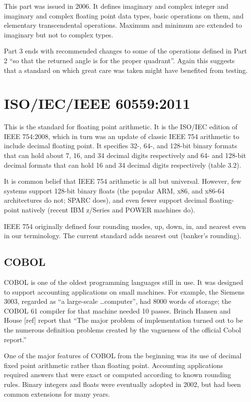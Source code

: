 \documentclass{article}
\begin{document}
This part was issued in 2006.  It defines imaginary and
complex integer and imaginary and complex floating point
data types, basic operations on them, and elementary
transcendental operations.  Maximum and minimum are extended
to imaginary but not to complex types.

Part 3 ends with recommended changes to some of the operations
defined in Part 2 ``so that the returned angle is for the
proper quadrant''.  Again this suggests that a standard on which
great care was taken might have benefited from testing.

\section{ISO/IEC/IEEE 60559:2011}

This is the standard for floating point arithmetic.
It is the ISO/IEC edition of IEEE 754:2008, which in
turn was an update of classic IEEE 754 arithmetic to
include decimal floating point.  It specifies
32-, 64-, and 128-bit binary formats that can hold about 7,
16, and 34 decimal digits respectively
and 64- and 128-bit decimal formats that can hold
16 and 34 decimal digits respectively (table 3.2).

It is common belief that IEEE 754 arithmetic is all but
universal.  However, few systems support 128-bit binary floats
(the popular ARM, x86, and x86-64 architectures do not; SPARC
does), and even fewer support decimal floating-point natively
(recent IBM z/Series and POWER machines do).

IEEE 754 originally defined four rounding modes, up, down, in,
and nearest even in our terminology.  The current standard
adds nearest out (banker's rounding).

\subsection{COBOL}

COBOL is one of the oldest programming languages still in use.
It was designed to support accounting applications on small
machines.  For example, the Siemens 3003, regarded as ``a large-scale
\dots computer'', had 8000 words of
storage; the COBOL 61 compiler for that machine needed 10 passes.
Brinch Hansen and House [ref] report that ``The major problem of
implementation turned out to be the numerous definition problems
created by the vagueness of the official Cobol report.''

One of the major features of COBOL from the beginning was its
use of decimal fixed point arithmetic rather than floating point.
Accounting applications required answers that were exact or
computed according to known rounding rules.  Binary integers
and floats were eventually adopted in 2002, but had been common
extensions for many years.  
\end{document}
